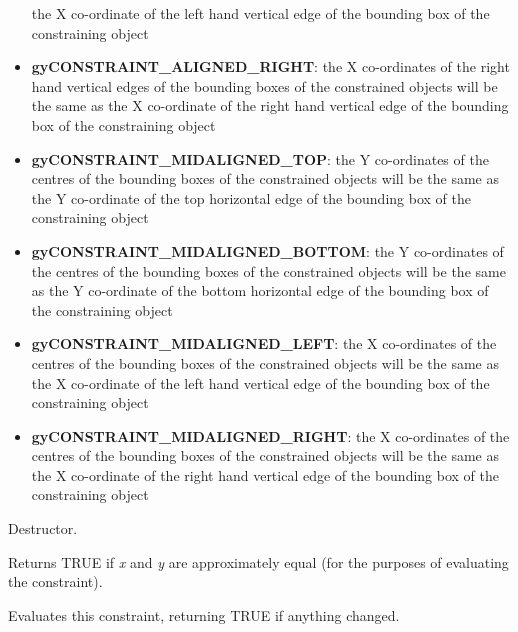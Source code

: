 \begin{itemize}
the X co-ordinate of the left hand vertical edge of the bounding box
of the constraining object
\item {\bf gyCONSTRAINT\_ALIGNED\_RIGHT}: the X co-ordinates of the right hand vertical edges
of the bounding boxes of the constrained objects will be the same as
the X co-ordinate of the right hand vertical edge of the bounding box
of the constraining object
\item {\bf gyCONSTRAINT\_MIDALIGNED\_TOP}: the Y co-ordinates of the centres of
the bounding boxes of the constrained objects will be the same
as the Y co-ordinate of the top horizontal edge of
the bounding box of the constraining object
\item {\bf gyCONSTRAINT\_MIDALIGNED\_BOTTOM}: the Y co-ordinates of the centres of
the bounding boxes of the constrained objects will be the same
as the Y co-ordinate of the bottom horizontal edge of
the bounding box of the constraining object
\item {\bf gyCONSTRAINT\_MIDALIGNED\_LEFT}: the X co-ordinates of the centres of
the bounding boxes of the constrained objects will be the same
as the X co-ordinate of the left hand vertical edge of
the bounding box of the constraining object
\item {\bf gyCONSTRAINT\_MIDALIGNED\_RIGHT}: the X co-ordinates of the centres of
the bounding boxes of the constrained objects will be the same as
the X co-ordinate of the right hand vertical edge of
the bounding box of the constraining object
\end{itemize}




Destructor.



Returns TRUE if {\it x} and {\it y} are approximately equal (for the purposes
of evaluating the constraint).



Evaluates this constraint, returning TRUE if anything changed.

\label{oglconstraintsetspacing}


